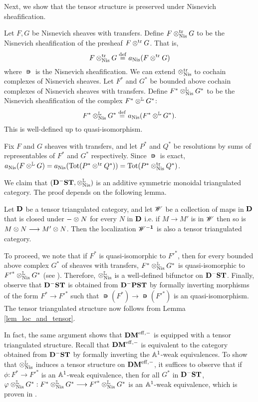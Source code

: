 Next, we show that the tensor structure is preserved under
Nisnevich sheafification.

\begin{defn}\label{def_shcor_tensor}
Let $F, G$ be Nisnevich sheaves with transfers. Define
$F \ttrNis G$ to be the Nisnevich sheafification of the presheaf
$F \ttr G$. That is,
\[
F \ttrNis G \defeq \nis(F \ttr G)
\]
where $\nis$ is the Nisnevich sheafification. We can extend 
$\ttrNis$ to cochain complexes of Nisnevich sheaves. Let $F^*$ and 
$G^*$ be bounded above cochain complexes of Nisnevich sheaves with transfers. 
Define $F^* \tLNis G^*$ to be the Nisnevich sheafification of the 
complex $F^* \tL G^*$:
\[
F^* \tLNis G^* \defeq \nis(F^* \tL G^*).
\]
This is well-defined up to quasi-isomorphism.
\end{defn}

\begin{rmk}
Fix $F$ and $G$ sheaves with transfers, and let $P^*$ and $Q^*$ be
resolutions by sums of representables of $F^*$ and $G^*$
respectively. Since $\nis$ is exact, $\nis(F \tL G) =
\nis(\Tot(P^* \ttr Q^*)) = \Tot(P^* \ttrNis Q^*)$.
\end{rmk}

We claim that $(\DShCor, \tLNis)$ is an additive symmetric 
monoidal triangulated category. The proof depends on the following
lemma.

\begin{lem}\label{lem_loc_and_tensor}
Let $\DCat$ be a tensor triangulated category, and let $\Cat{W}$
be a collection of maps in $\DCat$ that is closed under $-\tensor 
N$ for every $N$ in $\DCat$ i.e. if $M \to M'$ is in $\Cat{W}$ then 
so is $M \tensor N \to M' \tensor N$. Then the localization $\DCat 
[\Cat{W}^{-1}]$ is also a tensor triangulated category.
\end{lem}

To proceed, we note that if $F^*$ is quasi-isomorphic to ${F'}^*$,
then for every bounded above complex $G^*$ of sheaves with 
transfers, $F^* \tLNis G^*$ is quasi-isomorphic to 
${F'}^* \tLNis G^*$ (see \cite[8.16]{MVW}). Therefore, $\tLNis$ is 
a well-defined bifunctor on $\DShCor$. Finally, observe that 
$\DShCor$ is obtained from $\DCat^-\PST$ by formally inverting 
morphisms of the form $F^* \to {F'}^*$ such that $\nis(F^*) \to 
\nis({F'}^*)$ is an quasi-isomorphism. The tensor triangulated 
structure now follows from Lemma \ref{lem_loc_and_tensor}.

In fact, the same argument shows that $\DMeff$ is equipped with a
tensor triangulated structure. Recall that $\DMeff$ is equivalent to
the category obtained from $\DShCor$ by formally inverting the
$\A^1$-weak equivalences.  To show that $\tLNis$ induces a tensor
structure on $\DMeff$, it suffices to observe that if $\phi : F^* \to
{F'}^*$ is an $\A^1$-weak equivalence, then for all $G^*$ in
$\DShCor$, $\phi \tLNis G^* : F^* \tLNis G^* \to {F'}^* \tLNis G^*$ is
an $\A^1$-weak equivalence, which is proven in \cite[9.5]{MVW}.

